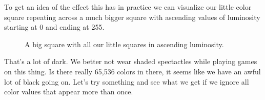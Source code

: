 To get an idea of the effect this has in practice we can visualize our little color square repeating across a much
bigger square with ascending values of luminosity starting at 0 and ending at 255.
\begin{figure}[H]
    \centering
    \begin{adjustbox}{width=5cm,center}
    \end{adjustbox}
\caption{A big square with all our little squares in ascending luminosity.}
\end{figure}

That's a lot of dark. We better not wear shaded spectactles while playing games on this thing. Is there really 65,536 colors in there,
it seems like we have an awful lot of black going on. Let's try something and see what we get if we ignore all color values that appear
more than once.

